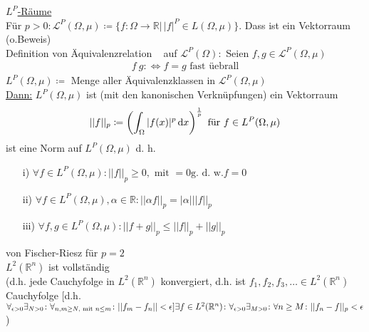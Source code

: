 \underline{$L^P$-Räume}\\
Für $p>0: \mathscr{L}^P(\Omega, \mu)\coloneqq \{f\colon \Omega\to\mathbb{R} |\, |f|^P \in L(\Omega, \mu)\}$. Dass ist ein Vektorraum (o.Beweis)\\
Definition von Äquivalenzrelation ~ auf $\mathscr{L}^P(\Omega)\colon$ Seien $f,g\in\mathscr{L}^P(\Omega, \mu)$
\begin{align*}
    f~g\colon \Leftrightarrow f=g \text{ fast üebrall}
\end{align*}
$L^P(\Omega,\mu)\coloneqq$ Menge aller Äquivalenzklassen in $\mathscr{L}^P(\Omega, \mu)$\\
\underline{Dann:} $L^P(\Omega, \mu)$ ist (mit den kanonischen Verknüpfungen) ein Vektorraum
\begin{align*}
    ||f||_p\coloneqq \left(\int_{{\Omega}} |f(x)|^p \,\text{d}x\right)^{\frac{1}{p}} \text{ für } f\in L^P(\Omega,\mu)
\end{align*}
ist eine Norm auf $L^P(\Omega, \mu)$ d. h.
\begin{itemize}
    \item[i)] $\forall f\in L^P(\Omega,\mu)\colon ||f||_p \geq 0, \text{ mit } = 0 \text{g. d. w.} f= 0$
    \item[ii)] $\forall f\in L^P(\Omega,\mu), \alpha\in\mathbb{R}\colon ||\alpha f||_p = |\alpha| ||f||_p$
    \item[iii)] $\forall f,g\in L^P(\Omega,\mu)\colon ||f+g||_p \leq ||f||_p + ||g||_p$
\end{itemize}
\begin{satz}
    von Fischer-Riesz für $p=2$\\
    $L^2(\mathbb{R}^n)$ ist vollständig\\
    (d.h. jede Cauchyfolge in $L^2(\mathbb{R}^n)$ konvergiert, d.h. ist $f_1, f_2, f_3, \dots \in  L^2(\mathbb{R}^n)$ Cauchyfolge [d.h. $\forall_{\epsilon > 0} \exists_{N>0}\colon\forall_{n,m\geq N, \text{ mit }n \leq m} \colon ||f_m -f_n||<\epsilon]\\
    \exists f\in L^2(\mathbb{R}^n)\colon \forall_{\epsilon>0} \exists_{M>0}\colon \forall{n\geq M}\colon ||f_n-f||_p <\epsilon$)
\end{satz}

